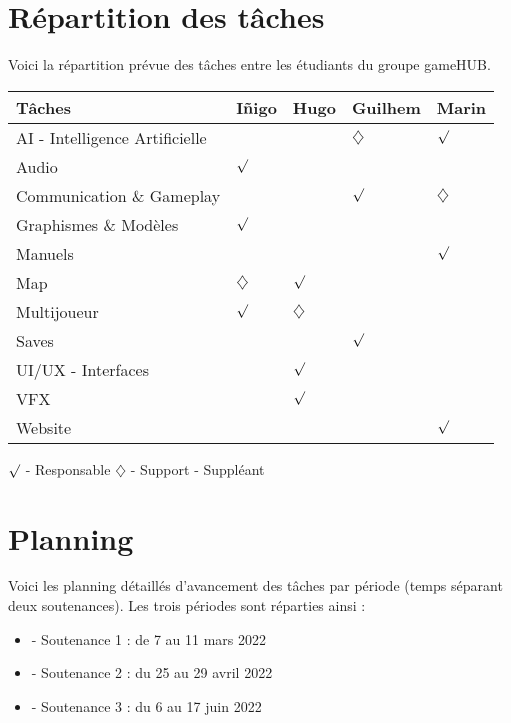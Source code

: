 \section{Répartition des tâches}
\noindent Voici la répartition prévue des tâches entre les étudiants du groupe gameHUB.


\begin{center}
\begin{tabular}{|l|l|l|l|l|}
\hline
Tâches                         & Iñigo & Hugo        & Guilhem & Marin \\ \hline
AI - Intelligence Artificielle &       &             & $\diamondsuit$        & $\surd$  \\ \hline
Audio                          & $\surd$  &             &         &       \\ \hline
Communication \& Gameplay                       &       &             & $\surd$    & $\diamondsuit$      \\ \hline
Graphismes \& Modèles          & $\surd$  &             &         &       \\ \hline
Manuels                        &       &             &         & $\surd$  \\ \hline
Map                            & $\diamondsuit$ & $\surd$        &         &       \\ \hline
Multijoueur                    & $\surd$  & $\diamondsuit$ &         &       \\ \hline
Saves                          &       &             & $\surd$    &       \\ \hline
UI/UX - Interfaces             &       & $\surd$        &         &       \\ \hline
VFX                            &       & $\surd$        &         &       \\ \hline
Website                        &       &  &         & $\surd$  \\ \hline
\end{tabular}
\end{center}

\noindent $\surd$ - Responsable
\newline
$\diamondsuit$ - Support - Suppléant

\section{Planning}

\noindent Voici les planning détaillés d’avancement des tâches par période (temps séparant deux soutenances). Les trois périodes sont réparties ainsi :
\begin{itemize}
    \item - Soutenance 1 : de 7 au 11 mars 2022
    \item - Soutenance 2 : du 25 au 29 avril 2022
    \item - Soutenance 3 : du 6 au 17 juin 2022
\end{itemize}


